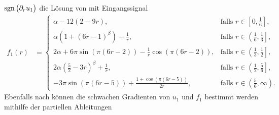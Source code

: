$\operatorname{sgn}\big(\partial_r u_1\big)$ die Lösung von  mit
Eingangssignal
\begin{align*}
  f_1(r)
  &=
  \begin{cases}
    \alpha-12(2-9r), 
    & \text{falls } r\in \left[0,\frac{1}{6}\right],\\
    \alpha\left(1+(6r-1)^\beta\right)-\frac{1}{r}, 
    & \text{falls } r\in \left(\frac{1}{6}, \frac{1}{3}\right],\\
    2\alpha+6\pi\sin(\pi(6r-2))-\frac{1}{r}\cos(\pi(6r-2)), 
    & \text{falls } r\in \left(\frac{1}{3}, \frac{1}{2}\right],\\
    2\alpha\left(\frac{5}{2}-3r\right)^\beta+\frac{1}{r},
    & \text{falls } r\in \left(\frac{1}{2}, \frac{5}{6}\right],\\
    -3\pi\sin(\pi(6r-5))+\frac{1+\cos(\pi(6r-5))}{2r}, 
    & \text{falls } r\in \left(\frac{5}{6}, \infty\right).
  \end{cases}
\end{align*}
Ebenfalls nach  können die schwachen
Gradienten von $u_1$ und $f_1$ bestimmt werden mithilfe der partiellen 
Ableitungen

